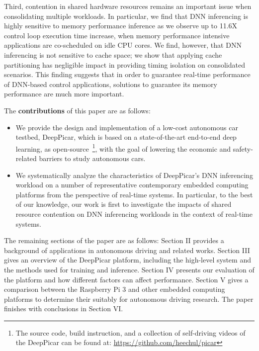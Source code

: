 Third, contention in shared hardware resources remains an important
issue when consolidating multiple workloads. 
In particular, we find that DNN inferencing is highly sensitive to
memory performance inference as we observe up to 11.6X control loop
execution time increase, when memory performance intensive
applications are co-scheduled on idle CPU cores.
We find, however, that DNN inferencing is not sensitive to cache
space; we show that applying cache partitioning has negligible impact
in providing timing isolation on consolidated scenarios. This finding
suggests that in order to guarantee real-time performance of DNN-based
control applications, solutions to guarantee its memory performance
are much more important.

The {\bf contributions} of this paper are as follows:
\begin{itemize}
  \item We provide the design and implementation of a low-cost
    autonomous car testbed, DeepPicar, which is based on a
    state-of-the-art end-to-end deep learning, as
    open-source~\footnote{The source code, build 
instruction, and a collection of self-driving videos of the DeepPicar
can be found at: \url{https://github.com/heechul/picar}}, with the
    goal of lowering the economic and safety-related barriers to study
    autonomous cars.

  \item We systematically analyze the characteristics of DeepPicar's
    DNN inferencing workload on a number of representative
    contemporary embedded computing platforms from the perspective of
    real-time systems. In particular, to the best of our knowledge,
    our work is first to investigate the impacts of shared resource
    contention on DNN inferencing workloads in the context of
    real-time systems.

\end{itemize}

The remaining sections of the paper are as follows: Section II 
provides a background of applications in autonomous driving and related works.
 Section III gives an overview of the DeepPicar platform, including the 
high-level system and the methods used for training and inference. 
Section IV presents our evaluation of the platform and how different 
factors can affect performance. Section V gives a comparison between 
the Raspberry Pi 3 and other embedded computing platforms to 
determine their suitably for autonomous driving research. The paper finishes with 
conclusions in Section VI.
